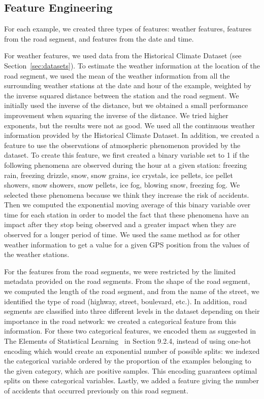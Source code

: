 \documentclass[conference]{IEEEtran}
\begin{document}
\subsection{Feature Engineering}

For each example, we created three types of features: weather features,
features from the road segment, and features from the date and time.

For weather features, we used data from the Historical Climate Dataset (see Section~\ref{sec:datasets}).
To estimate the weather information at the location of the road
segment, we used the mean of the weather information from all the
surrounding weather stations at the date and hour of the example, weighted
by the inverse squared distance between the station and the
road segment. We initially used the inverse of the distance, but we
obtained a small performance improvement when squaring the inverse of
the distance. We tried higher exponents, but the results were not as good.
We used all the continuous weather information provided
by the Historical Climate Dataset. In addition, we created a feature to use
the observations of atmospheric phenomenon provided by the dataset.
To create this feature, we first created a binary variable set to 1 if the
following phenomena are observed during the hour at a given station:
freezing rain, freezing drizzle, snow, snow grains, ice crystals, ice pellets,
ice pellet showers, snow showers, snow pellets, ice fog, blowing snow, freezing
fog. We selected these phenomena because we think they increase the risk of
accidents. Then we computed the exponential moving average of this binary
variable over time for each station in order to model the fact that
these phenomena have an impact after they stop being observed and a greater
impact when they are observed for a longer period of time.
We used the same method as for other weather information to get a value for a given 
GPS position from the values of the weather stations.

For the features from the road segments, we were restricted by the limited
metadata provided on the road segments. From the shape of the road segment,
we computed the length of the road segment, and from the name of the
street, we identified the type of road (highway, street, boulevard, etc.).
In addition, road segments are classified into three different levels in
the dataset depending on their importance in the road network: we created a
categorical feature from this information. For these two categorical
features, we encoded them as suggested in The Elements of Statistical
Learning~\cite{elementsofstat} in Section 9.2.4, instead of using one-hot
encoding which would create an exponential number of possible splits: we indexed the
categorical variable ordered by the proportion of the examples belonging to
the given category, which are positive samples. This encoding guarantees 
optimal splits on these categorical variables. Lastly, we added a
feature giving the number of accidents that occurred previously on this
road segment.
\end{document}
